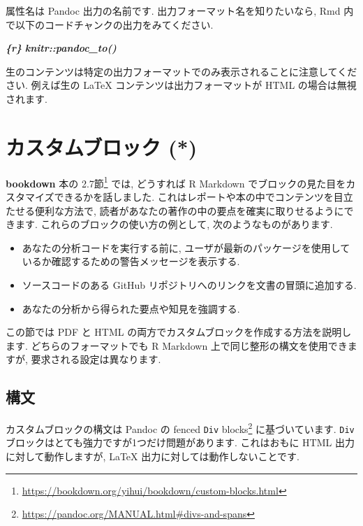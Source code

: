 \documentclass[
  11pt,
  lualatex,ja=standard,jafont=noto]{bxjsreport}
\newenvironment{Shaded}{\begin{snugshade}}{\end{snugshade}}
\newcommand{\InformationTok}[1]{\textcolor[rgb]{0.56,0.35,0.01}{\textbf{\textit{#1}}}}
\providecommand{\tightlist}{%
  \setlength{\itemsep}{0pt}\setlength{\parskip}{0pt}}
\renewcommand{\href}[2]{#2\footnote{\url{#1}}}
\begin{document}
属性名は Pandoc 出力の名前です. 出力フォーマット名を知りたいなら, Rmd 内で以下のコードチャンクの出力をみてください.

\begin{Shaded}
\begin{Highlighting}[]
\InformationTok{\textasciigrave{}\textasciigrave{}\textasciigrave{}\{r\}}
\InformationTok{knitr::pandoc\_to()}
\InformationTok{\textasciigrave{}\textasciigrave{}\textasciigrave{}}
\end{Highlighting}
\end{Shaded}

生のコンテンツは特定の出力フォーマットでのみ表示されることに注意してください. 例えば生の LaTeX コンテンツは出力フォーマットが HTML の場合は無視されます.

\hypertarget{custom-blocks}{%
\section{カスタムブロック (*)}\label{custom-blocks}}

\textbf{bookdown} 本の \href{https://bookdown.org/yihui/bookdown/custom-blocks.html}{2.7節} では, どうすれば R Markdown でブロックの見た目をカスタマイズできるかを話しました. これはレポートや本の中でコンテンツを目立たせる便利な方法で, 読者があなたの著作の中の要点を確実に取りせるようにできます. これらのブロックの使い方の例として, 次のようなものがあります.

\begin{itemize}
\tightlist
\item
  あなたの分析コードを実行する前に, ユーザが最新のパッケージを使用しているか確認するための警告メッセージを表示する.
\item
  ソースコードのある GitHub リポジトリへのリンクを文書の冒頭に追加する.
\item
  あなたの分析から得られた要点や知見を強調する.
\end{itemize}

この節では PDF と HTML の両方でカスタムブロックを作成する方法を説明します. どちらのフォーマットでも R Markdown 上で同じ整形の構文を使用できますが, 要求される設定は異なります.

\hypertarget{block-syntax}{%
\subsection{構文}\label{block-syntax}}

カスタムブロックの構文は Pandoc の \href{https://pandoc.org/MANUAL.html\#divs-and-spans}{fenced \texttt{Div} blocks} に基づいています. \texttt{Div} ブロックはとても強力ですが1つだけ問題があります. これはおもに HTML 出力に対して動作しますが, LaTeX 出力に対しては動作しないことです.
\end{document}
